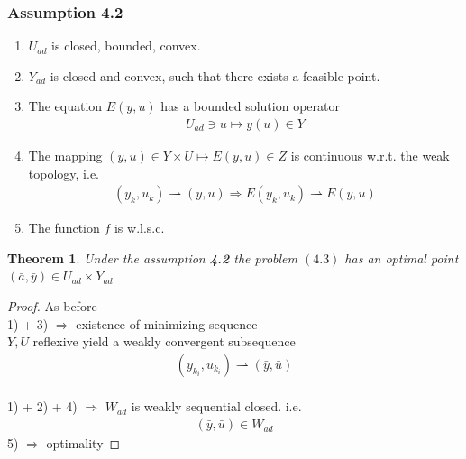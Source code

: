 \documentclass[a4paper,11pt,fleqn]{book}
\newtheorem{theorem}{Theorem}[section]
\theoremstyle{definition}
\theoremstyle{remark}
\begin{document}
\subsubsection*{Assumption 4.2}
\begin{enumerate}
	\item $U_{ad}$ is closed, bounded, convex. 
	\item $Y_{ad}$ is closed and convex, such that there exists a feasible point. 
	\item The equation $E(y, u)$ has a bounded solution operator 
		\begin{align*}
			U_{ad} \ni u \mapsto y(u) \in Y
		\end{align*}
	\item The mapping $(y, u) \in Y \times U \mapsto E(y, u) \in Z$ is continuous w.r.t. the weak topology, i.e.
		\begin{align*}
			(y_k, u_k) \rightharpoonup (y,u) \Rightarrow E(y_k, u_k) \rightharpoonup E(y, u) 
		\end{align*}
	\item The function $f$ is w.l.s.c.
\end{enumerate}

\begin{theorem}
	Under the assumption \textbf{4.2} the problem $(4. 3)$ has an optimal point $(\bar{a}, \bar{y}) \in U_{ad} \times Y_{ad}$ 
\end{theorem}
\begin{proof}
	As before\\
	1) + 3) $\Rightarrow$ existence of minimizing sequence\\
	$Y, U$ reflexive yield a weakly convergent subsequence 
	\begin{align*}
		(y_{k_i}, u_{k_i}) \rightharpoonup (\bar{y}, \bar{u})
	\end{align*}\\
	1) + 2) + 4) $\Rightarrow$ $W_{ad}$ is weakly sequential closed. i.e.
	\begin{align*}
		(\bar{y}, \bar{u}) \in W_{ad}
	\end{align*}
	5) $\Rightarrow$ optimality
\end{proof}
\end{document}

